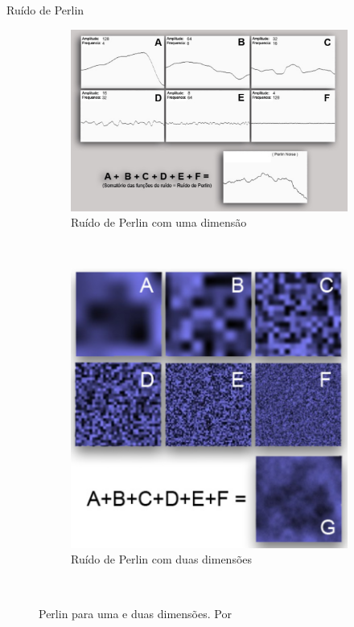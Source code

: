 \begin{frame}{Ruído de Perlin}
    
    \begin{figure}
        \centering
        \begin{subfigure}[b]{0.6\textwidth}
            \includegraphics[width=\textwidth]{img/perlin1d}
            \caption{Ruído de Perlin com uma dimensão}
            \label{fig:perlin1d}
        \end{subfigure}
        ~ %
        \begin{subfigure}[b]{0.35\textwidth}
            \includegraphics[width=\textwidth]{img/perlin2d}
            \caption{Ruído de Perlin com duas dimensões}
            \label{fig:perlin2d}
        \end{subfigure}
        ~ %
        \caption{Perlin para uma e duas dimensões. Por \cite{elias2000perlin}}
        \label{fig:perlin1d2d}
    \end{figure}
    

\end{frame}
